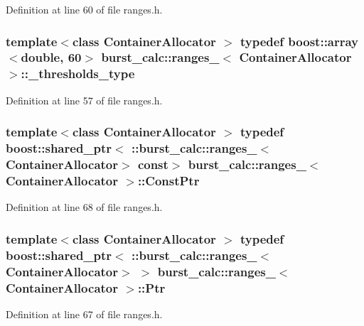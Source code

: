 \-Definition at line 60 of file ranges.\-h.

\subsubsection[{\-\_\-thresholds\-\_\-type}]{\setlength{\rightskip}{0pt plus 5cm}template$<$class Container\-Allocator $>$ typedef boost\-::array$<$double, 60$>$ {\bf burst\-\_\-calc\-::ranges\-\_\-}$<$ \-Container\-Allocator $>$\-::{\bf \-\_\-thresholds\-\_\-type}}\label{structburst__calc_1_1ranges___a3578d1446659965c024aecf4a9f7ea80}


\-Definition at line 57 of file ranges.\-h.

\subsubsection[{\-Const\-Ptr}]{\setlength{\rightskip}{0pt plus 5cm}template$<$class Container\-Allocator $>$ typedef boost\-::shared\-\_\-ptr$<$ \-::{\bf burst\-\_\-calc\-::ranges\-\_\-}$<$\-Container\-Allocator$>$ const$>$ {\bf burst\-\_\-calc\-::ranges\-\_\-}$<$ \-Container\-Allocator $>$\-::{\bf \-Const\-Ptr}}\label{structburst__calc_1_1ranges___a7f78bf723f7c6f962081f8668e36ec39}


\-Definition at line 68 of file ranges.\-h.

\subsubsection[{\-Ptr}]{\setlength{\rightskip}{0pt plus 5cm}template$<$class Container\-Allocator $>$ typedef boost\-::shared\-\_\-ptr$<$ \-::{\bf burst\-\_\-calc\-::ranges\-\_\-}$<$\-Container\-Allocator$>$ $>$ {\bf burst\-\_\-calc\-::ranges\-\_\-}$<$ \-Container\-Allocator $>$\-::{\bf \-Ptr}}\label{structburst__calc_1_1ranges___a07df808fdb0b40be194b5e59f53c19a5}


\-Definition at line 67 of file ranges.\-h.


